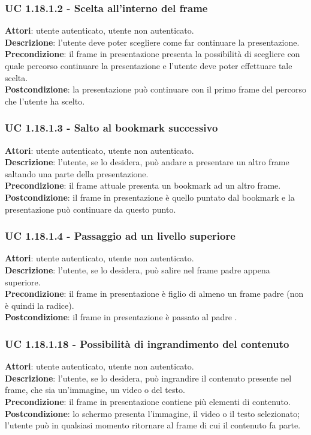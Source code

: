 	\subsubsection{UC 1.18.1.2 - Scelta all'interno del frame}{
		\label{uc1.18.1.2}
		\textbf{Attori}: utente autenticato, utente non autenticato. \\
		\textbf{Descrizione}: l'utente deve poter scegliere come far continuare la presentazione. \\
		\textbf{Precondizione}: il frame in presentazione presenta la possibilità di scegliere con quale percorso continuare la presentazione e l'utente deve poter effettuare tale scelta.	\\
		\textbf{Postcondizione}: la presentazione può continuare con il primo frame del percorso che l'utente ha scelto.	\\
	}
	\subsubsection{UC 1.18.1.3 - Salto al bookmark successivo}{
		\label{uc1.18.1.3}
		\textbf{Attori}: utente autenticato, utente non autenticato. \\
		\textbf{Descrizione}: l'utente, se lo desidera, può andare a presentare un altro frame saltando una parte della presentazione. \\
		\textbf{Precondizione}: il frame attuale presenta un bookmark ad un altro frame.	\\
		\textbf{Postcondizione}: il frame in presentazione è quello puntato dal bookmark e la presentazione può continuare da questo punto.	\\
	}
	\subsubsection{UC 1.18.1.4 - Passaggio ad un livello superiore}{
		\label{uc1.18.1.4}
		\textbf{Attori}: utente autenticato, utente non autenticato. \\
		\textbf{Descrizione}: l'utente, se lo desidera, può salire nel frame padre appena superiore. \\
		\textbf{Precondizione}: il frame in presentazione è figlio di almeno un frame padre (non è quindi la radice).	\\
		\textbf{Postcondizione}: il frame in presentazione è passato al padre .	\\
	}
	\subsubsection{UC 1.18.1.18 - Possibilità di ingrandimento del contenuto}{
		\label{uc1.18.1.18}
		\textbf{Attori}: utente autenticato, utente non autenticato. \\
		\textbf{Descrizione}: l'utente, se lo desidera, può ingrandire il contenuto presente nel frame, che sia un'immagine, un video o del testo. \\
		\textbf{Precondizione}: il frame in presentazione contiene più elementi di contenuto.	\\
		\textbf{Postcondizione}: lo schermo presenta l'immagine, il video o il testo selezionato; l'utente può in qualsiasi momento ritornare al frame di cui il contenuto fa parte.	\\
	}
